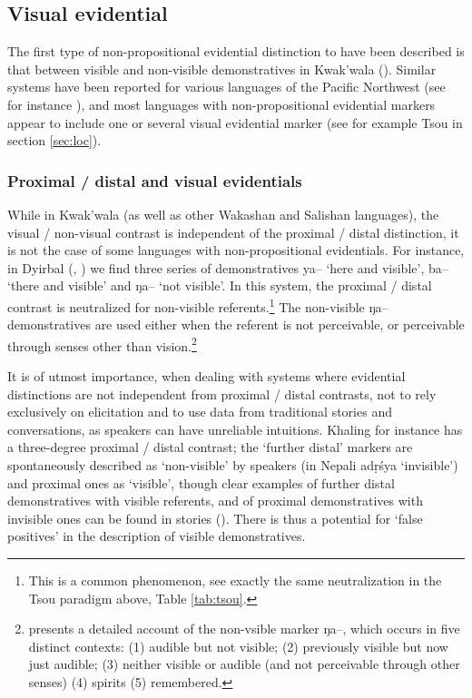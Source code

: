 \documentclass[oneside,a4paper,11pt]{article}
\newcommand{\ipa}[1]{{\phon \mbox{#1}}} %
\begin{document}
\subsection{Visual evidential} \label{sec:visible}
The first type of non-propositional evidential distinction to have been described  is that between visible and non-visible demonstratives in Kwak'wala (\citealt[527-531]{boas11kwakiutl}). Similar systems have been reported for various languages of the Pacific Northwest (see for instance \citealt{bach06deixis.wakashan}), and most languages with non-propositional evidential markers appear to include one or several visual evidential marker (see for example Tsou in section \ref{sec:loc}).  


\subsubsection{Proximal / distal and visual evidentials} \label{sec:proximal}
While in Kwak'wala (as well as other Wakashan and Salishan languages), the visual / non-visual contrast is independent of the proximal / distal distinction, it is not the case of some languages with non-propositional evidentials. For instance, in Dyirbal (\citealt[45]{dixon72dyirbal}, \citealt{dixon14nonvisible}) we find three series of demonstratives \ipa{ya--} `here and visible', \ipa{ba--} `there and visible' and \ipa{ŋa--} `not visible'. In this system, the proximal / distal contrast is neutralized for non-visible referents.\footnote{This is a common phenomenon, see exactly the same neutralization in the Tsou paradigm above, Table \ref{tab:tsou}.} The non-visible \ipa{ŋa--} demonstratives are used either when the referent is not perceivable, or perceivable through senses other than vision.\footnote{\citet{dixon14nonvisible} presents a detailed account of the non-vsible marker  \ipa{ŋa--}, which occurs in five distinct contexts: (1) audible but not visible; (2) previously visible but now just audible; (3) neither visible or audible (and not perceivable through other senses) (4) spirits (5) remembered.  } 

It is of utmost importance, when dealing with systems where evidential distinctions are not independent from proximal / distal contrasts, not to rely exclusively on elicitation and to use data from traditional stories and conversations, as speakers can have unreliable intuitions. Khaling for instance has a three-degree proximal / distal contrast; the `further distal' markers are spontaneously described as `non-visible' by speakers (in Nepali \ipa{adṛśya} `invisible') and proximal ones as `visible', though clear examples of further distal demonstratives with visible referents, and of proximal demonstratives with invisible ones can be found in stories (\citealt[399]{jacques14auditory}). There is thus a potential for `false positives' in the description of visible demonstratives.
\end{document}
